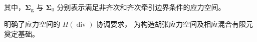 \documentclass[notheorems]{beamer}
\begin{document}
\begin{frame}
{\begin{tcolorbox}
{					{\fontsize{7.6}{9.6}\selectfont
						其中，$\boldsymbol{\Sigma}_{\boldsymbol{g}}$ 与 $\boldsymbol{\Sigma}_{0}$
						分别表示满足非齐次和齐次牵引边界条件的应力空间。}
				}
			\end{tcolorbox}

			\begin{tcolorbox}[
				colback=structure.fg, colframe=structure.fg,
				arc=3pt, boxrule=0pt,
				top=3pt, bottom=3pt, left=8pt, right=8pt]
				\centering
				{\fontsize{8.0}{11}\selectfont\sffamily\color{white}
					明确了应力空间的 $H(\operatorname{div})$ 协调要求，
					为构造胡张应力空间及相应混合有限元奠定基础。}
			\end{tcolorbox}
		}
		
	\end{frame}
	
	
\end{document}
